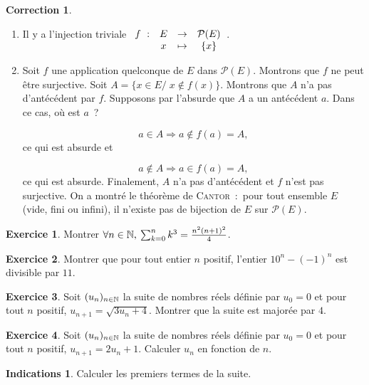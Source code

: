 \documentclass[11pt,a4paper]{article}
\theoremstyle{definition}
\newtheorem{exo}{Exercice}
\newtheorem{ind}{Indications}
\newtheorem{cor}{Correction}
\newcommand{\exercice}[1]{} \newcommand{\finexercice}{}
\newcommand{\enonce}{\begin{exo}} \newcommand{\finenonce}{\end{exo}}
\newcommand{\indication}{\begin{ind}} \newcommand{\finindication}{\end{ind}}
\newcommand{\correction}{\begin{cor}} \newcommand{\fincorrection}{\end{cor}}
\newcommand{\noindication}{\stepcounter{ind}}
\newcommand{\nocorrection}{\stepcounter{cor}}
\begin{document}
\correction
\begin{enumerate}
 \item  Il y a l'injection triviale $\begin{array}[t]{cccc}
f~:&E&\rightarrow&\mathcal{P}(E)\\
 &x&\mapsto&\{x\}
\end{array}$.
 \item  Soit $f$ une application quelconque de $E$ dans $\mathcal{P}(E)$. Montrons que $f$ ne peut être
surjective.
Soit $A=\{x\in E/\;x\notin f(x)\}$. Montrons que $A$ n'a pas d'antécédent par $f$. Supposons par
l'absurde que $A$ a un antécédent $a$. Dans ce cas, où est $a$~?~

$$a\in A\Rightarrow a\notin f(a)=A,$$
ce qui est absurde et

$$a\notin A\Rightarrow a\in f(a)=A,$$
ce qui est absurde. Finalement, $A$ n'a pas d'antécédent et $f$ n'est pas surjective. On a montré le théorème de
\textsc{Cantor}~:~pour tout ensemble $E$ (vide, fini ou infini), il n'existe pas de bijection de $E$ sur
$\mathcal{P}(E)$.
\end{enumerate}
\fincorrection
\finexercice
\exercice{7011, megy, 2016/08/25}

\enonce 
Montrer $\forall n \in \mathbb{N},\: \sum_{k=0}^n k^3=\frac{n^2(n+1)^2}{4}$.
\finenonce

\noindication

\nocorrection

\finexercice
\exercice{7012, megy, 2016/08/25}

\enonce
Montrer que pour tout entier $n$ positif, l'entier $10^n - (-1)^n$ est divisible par $11$.
\finenonce

\noindication

\nocorrection

\finexercice
\exercice{7013, megy, 2016/08/25}

\enonce
Soit $(u_n)_{n\in\mathbb{N}}$ la suite de nombres réels définie par  $u_0=0$ et pour tout $n$ positif, $u_{n+1} = \sqrt{3u_n+4}$. Montrer que la suite est majorée par $4$.
\finenonce

\noindication

\nocorrection

\finexercice
\exercice{7014, megy, 2016/08/25}

\enonce
Soit $(u_n)_{n\in\mathbb{N}}$ la suite de nombres réels définie par  $u_0=0$ et pour tout $n$ positif, $u_{n+1} = 2u_n+1$. Calculer  $u_n$ en fonction de $n$.
\finenonce

\indication
Calculer les premiers termes de la suite.
\finindication
\end{document}
